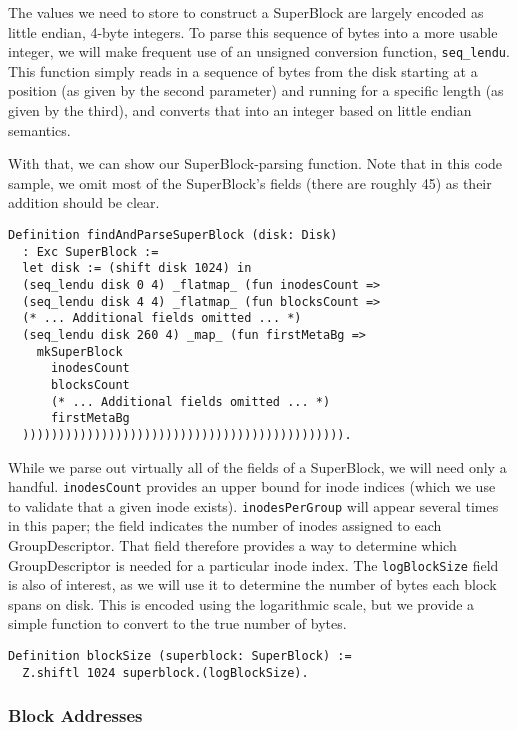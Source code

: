 \documentclass[nocopyrightspace]{sigplanconf}
\begin{document}
The values we need to store to construct a SuperBlock are largely encoded as
little endian, 4-byte integers. To parse this sequence of bytes into a more
usable integer, we will make frequent use of an unsigned conversion function,
{\tt seq\_lendu}. This function simply reads in a sequence of bytes from the
disk starting at a position (as given by the second parameter) and running for
a specific length (as given by the third), and converts that into an integer
based on little endian semantics. 

With that, we can show our SuperBlock-parsing function. Note that in this code
sample, we omit most of the SuperBlock's fields (there are roughly 45) as
their addition should be clear.

\begin{lstlisting}
Definition findAndParseSuperBlock (disk: Disk)
  : Exc SuperBlock :=
  let disk := (shift disk 1024) in
  (seq_lendu disk 0 4) _flatmap_ (fun inodesCount =>
  (seq_lendu disk 4 4) _flatmap_ (fun blocksCount =>
  (* ... Additional fields omitted ... *)
  (seq_lendu disk 260 4) _map_ (fun firstMetaBg =>
    mkSuperBlock
      inodesCount
      blocksCount
      (* ... Additional fields omitted ... *)
      firstMetaBg
  ))))))))))))))))))))))))))))))))))))))))))))).
\end{lstlisting}

While we parse out virtually all of the fields of a SuperBlock, we will need
only a handful. {\tt inodesCount} provides an upper bound for inode indices
(which we use to validate that a given inode exists). {\tt inodesPerGroup}
will appear several times in this paper; the field indicates the number of
inodes assigned to each GroupDescriptor. That field therefore provides a way
to determine which GroupDescriptor is needed for a particular inode index. The
{\tt logBlockSize} field is also of interest, as we will use it to determine
the number of bytes each block spans on disk. This is encoded using the
logarithmic scale, but we provide a simple function to convert to the true
number of bytes.

\begin{lstlisting}
Definition blockSize (superblock: SuperBlock) := 
  Z.shiftl 1024 superblock.(logBlockSize).
\end{lstlisting}

\subsubsection{Block Addresses}
\end{document}

